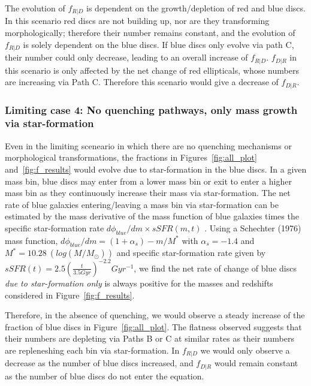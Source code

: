 \documentclass[useAMS,usenatbib]{mn2e}
\begin{document}
The evolution of $f_{R|D}$ is dependent on the growth/depletion of red and blue discs. In this scenario red discs are not building up, nor are they transforming morphologically; therefore their number remains constant, and the evolution of $f_{R|D}$ is solely dependent on the blue discs. If blue discs only evolve via path C, their number could only decrease, leading to an overall increase of $f_{R|D}$. 
$f_{D|R}$ in this scenario is only affected by the net change of red ellipticals, whose numbers are increasing via Path C. Therefore this scenario would give a decrease of $f_{D|R}$.%

\subsubsection{Limiting case 4: No quenching pathways, only mass growth via star-formation}

Even in the limiting sceneario in which there are no quenching mechanisms or morphological transformations, the fractions in Figures~\ref{fig:all_plot} and~\ref{fig:f_results} would evolve due to star-formation in the blue discs. In a given mass bin, blue discs may enter from a lower mass bin or exit to enter a higher mass bin as they continuously increase their mass via star-formation. The net rate of blue galaxies entering/leaving a mass bin via star-formation can be estimated by the mass derivative of the mass function of blue galaxies times the specific star-formation rate $d\phi_{blue}/dm \times sSFR (m,t)$ \citep{Peng2010}. Using a Schechter (1976) mass function, $d\phi_{blue}/dm = (1+\alpha_s) - m/M^*$ with $\alpha_s = -1.4$ and $M^* = 10.28~(log(M/M_{\odot}))$ \citep{Ichikawa2017} and specific star-formation rate given by \citet{Peng2010} $sSFR(t) = 2.5(\frac{t}{3.5 Gyr})^{-2.2}Gyr^{-1}$, we find the net rate of change of blue discs \emph{due to star-formation only} is always positive for the masses and redshifts considered in Figure~\ref{fig:f_results}. 

Therefore, in the absence of quenching, we would observe a steady increase of the fraction of blue discs in Figure~\ref{fig:all_plot}. The flatness observed suggests that their numbers are depleting via Paths B or C at similar rates as their numbers are repleneshing each bin via star-formation. In $f_{R|D}$ we would only observe a decrease as the number of blue discs increased, and $f_{D|R}$ would remain constant as the number of blue discs do not enter the equation.
\end{document}
